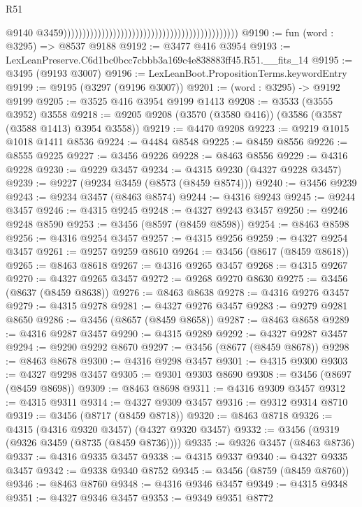 \begin{lexlean}{R51}
\begin{coremodule}
                                                                                                @9140
                                                                                                @3459))))))))))))))))))))))))))))))))))))))))))))))
@9190 := fun (word : @3295) => @8537 @9188
@9192 := @3477 @416 @3954
@9193 := LexLeanPreserve.C6d1bc0bcc7cbbb3a169c4e838883ff45.R51.__fits_14
@9195 := @3495 (@9193 @3007)
@9196 := LexLeanBoot.PropositionTerms.keywordEntry
@9199 := @9195 (@3297 (@9196 @3007))
@9201 := (word : @3295) -> @9192 @9199
@9205 := @3525 @416 @3954 @9199 @1413
@9208 := @3533 (@3555 @3952) @3558
@9218 := @9205 @9208 (@3570 (@3580 @416)) (@3586 (@3587 (@3588 @1413) @3954 @3558))
@9219 := @4470 @9208
@9223 := @9219 @1015 @1018 @1411 @8536
@9224 := @4484 @8548
@9225 := @8459 @8556
@9226 := @8555 @9225
@9227 := @3456 @9226
@9228 := @8463 @8556
@9229 := @4316 @9228
@9230 := @9229 @3457
@9234 := @4315 @9230 (@4327 @9228 @3457)
@9239 := @9227 (@9234 @3459 (@8573 (@8459 @8574)))
@9240 := @3456 @9239
@9243 := @9234 @3457 (@8463 @8574)
@9244 := @4316 @9243
@9245 := @9244 @3457
@9246 := @4315 @9245
@9248 := @4327 @9243 @3457
@9250 := @9246 @9248 @8590
@9253 := @3456 (@8597 (@8459 @8598))
@9254 := @8463 @8598
@9256 := @4316 @9254 @3457
@9257 := @4315 @9256
@9259 := @4327 @9254 @3457
@9261 := @9257 @9259 @8610
@9264 := @3456 (@8617 (@8459 @8618))
@9265 := @8463 @8618
@9267 := @4316 @9265 @3457
@9268 := @4315 @9267
@9270 := @4327 @9265 @3457
@9272 := @9268 @9270 @8630
@9275 := @3456 (@8637 (@8459 @8638))
@9276 := @8463 @8638
@9278 := @4316 @9276 @3457
@9279 := @4315 @9278
@9281 := @4327 @9276 @3457
@9283 := @9279 @9281 @8650
@9286 := @3456 (@8657 (@8459 @8658))
@9287 := @8463 @8658
@9289 := @4316 @9287 @3457
@9290 := @4315 @9289
@9292 := @4327 @9287 @3457
@9294 := @9290 @9292 @8670
@9297 := @3456 (@8677 (@8459 @8678))
@9298 := @8463 @8678
@9300 := @4316 @9298 @3457
@9301 := @4315 @9300
@9303 := @4327 @9298 @3457
@9305 := @9301 @9303 @8690
@9308 := @3456 (@8697 (@8459 @8698))
@9309 := @8463 @8698
@9311 := @4316 @9309 @3457
@9312 := @4315 @9311
@9314 := @4327 @9309 @3457
@9316 := @9312 @9314 @8710
@9319 := @3456 (@8717 (@8459 @8718))
@9320 := @8463 @8718
@9326 := @4315 (@4316 @9320 @3457) (@4327 @9320 @3457)
@9332 := @3456 (@9319 (@9326 @3459 (@8735 (@8459 @8736))))
@9335 := @9326 @3457 (@8463 @8736)
@9337 := @4316 @9335 @3457
@9338 := @4315 @9337
@9340 := @4327 @9335 @3457
@9342 := @9338 @9340 @8752
@9345 := @3456 (@8759 (@8459 @8760))
@9346 := @8463 @8760
@9348 := @4316 @9346 @3457
@9349 := @4315 @9348
@9351 := @4327 @9346 @3457
@9353 := @9349 @9351 @8772

\end{coremodule}
\end{lexlean}
